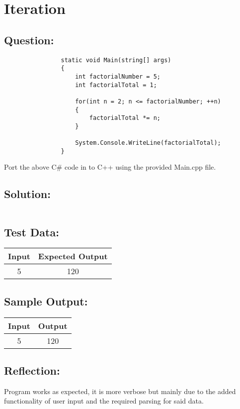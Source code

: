 \documentclass[main.tex]{subfiles}
\begin{document}
    \section{Iteration}
        \subsection*{Question:}
            \begin{verbatim}
                static void Main(string[] args)
                {
                    int factorialNumber = 5;
                    int factorialTotal = 1;

                    for(int n = 2; n <= factorialNumber; ++n)
                    {
                        factorialTotal *= n;
                    }

                    System.Console.WriteLine(factorialTotal);
                }
            \end{verbatim}
            Port the above C\# code in to C++ using the provided Main.cpp file.
            
        \subsection*{Solution:}
            \inputminted{cpp}{../05-Iteration/Iteration.cpp}

        \newpage
        \subsection*{Test Data:}
            \begin{center}
                \begin{tabular}{c c}
                    \hline
                    \textbf{Input} & \textbf{Expected Output} \\
                    \hline
                    5 & 120 \\
                \end{tabular}
            \end{center}
        
        \subsection*{Sample Output:}
            \begin{center}
                \begin{tabular}{c c}
                    \hline
                    \textbf{Input} & \textbf{Output} \\
                    \hline
                    5 & 120 \\
                \end{tabular}
            \end{center}

        \subsection*{Reflection:}
            Program works as expected, it is more verbose but mainly due to the added functionality
            of user input and the required parsing for said data.
\end{document}
